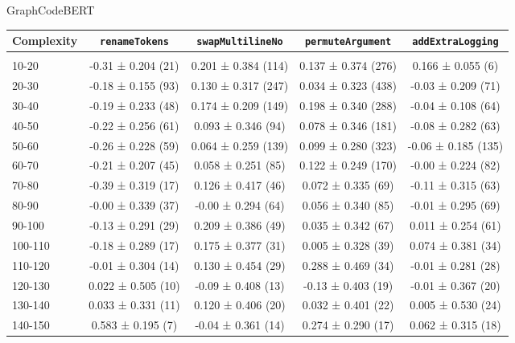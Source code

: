 \documentclass[sigconf,review,anonymous]{acmart}
\begin{document}
{    GraphCodeBERT
    \begin{table}[H]
      \tiny
      \begin{tabular}{l|cccc}
        Complexity          & \lstinline|renameTokens|        & \lstinline|swapMultilineNo|     & \lstinline|permuteArgument|     & \lstinline|addExtraLogging|     \\\hline\\
        10-20               & -0.31 ± 0.204 (21)  & 0.201 ± 0.384 (114) & 0.137 ± 0.374 (276) & 0.166 ± 0.055 (6)   \\
        20-30               & -0.18 ± 0.155 (93)  & 0.130 ± 0.317 (247) & 0.034 ± 0.323 (438) & -0.03 ± 0.209 (71)  \\
        30-40               & -0.19 ± 0.233 (48)  & 0.174 ± 0.209 (149) & 0.198 ± 0.340 (288) & -0.04 ± 0.108 (64)  \\
        40-50               & -0.22 ± 0.256 (61)  & 0.093 ± 0.346 (94)  & 0.078 ± 0.346 (181) & -0.08 ± 0.282 (63)  \\
        50-60               & -0.26 ± 0.228 (59)  & 0.064 ± 0.259 (139) & 0.099 ± 0.280 (323) & -0.06 ± 0.185 (135) \\
        60-70               & -0.21 ± 0.207 (45)  & 0.058 ± 0.251 (85)  & 0.122 ± 0.249 (170) & -0.00 ± 0.224 (82)  \\
        70-80               & -0.39 ± 0.319 (17)  & 0.126 ± 0.417 (46)  & 0.072 ± 0.335 (69)  & -0.11 ± 0.315 (63)  \\
        80-90               & -0.00 ± 0.339 (37)  & -0.00 ± 0.294 (64)  & 0.056 ± 0.340 (85)  & -0.01 ± 0.295 (69)  \\
        90-100              & -0.13 ± 0.291 (29)  & 0.209 ± 0.386 (49)  & 0.035 ± 0.342 (67)  & 0.011 ± 0.254 (61)  \\
        100-110             & -0.18 ± 0.289 (17)  & 0.175 ± 0.377 (31)  & 0.005 ± 0.328 (39)  & 0.074 ± 0.381 (34)  \\
        110-120             & -0.01 ± 0.304 (14)  & 0.130 ± 0.454 (29)  & 0.288 ± 0.469 (34)  & -0.01 ± 0.281 (28)  \\
        120-130             & 0.022 ± 0.505 (10)  & -0.09 ± 0.408 (13)  & -0.13 ± 0.403 (19)  & -0.01 ± 0.367 (20)  \\
        130-140             & 0.033 ± 0.331 (11)  & 0.120 ± 0.406 (20)  & 0.032 ± 0.401 (22)  & 0.005 ± 0.530 (24)  \\
        140-150             & 0.583 ± 0.195 (7)   & -0.04 ± 0.361 (14)  & 0.274 ± 0.290 (17)  & 0.062 ± 0.315 (18)  \\
      \end{tabular}
    \end{table}

}
\end{document}
